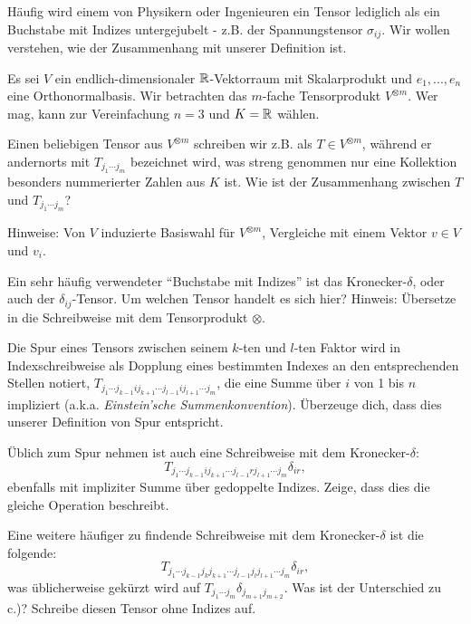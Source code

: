 \begin{sheet}
\begin{problem}[title={Aber Tensoren sind doch so Buchstaben mit Indizes}]
	\label{ex:TensorenMitIndizes}
	Häufig wird einem von Physikern oder Ingenieuren ein Tensor lediglich als ein Buchstabe mit Indizes untergejubelt - z.B. der Spannungstensor $\sigma_{ij}$. Wir wollen verstehen, wie der Zusammenhang mit unserer Definition ist.

	Es sei $V$ ein endlich-dimensionaler $\mathbb{R}$-Vektorraum mit Skalarprodukt und $e_1, ..., e_n$ eine Orthonormalbasis. Wir betrachten das $m$-fache Tensorprodukt $V^{\otimes m}$. Wer mag, kann zur Vereinfachung $n=3$ und $K=\mathbb{R}$ wählen.
	\begin{subproblem}
		Einen beliebigen Tensor aus $V^{\otimes m}$ schreiben wir z.B. als $T\in V^{\otimes m}$, während er andernorts mit $T_{j_1 \cdots j_m}$ bezeichnet wird, was streng genommen nur eine Kollektion besonders nummerierter Zahlen aus $K$ ist. Wie ist der Zusammenhang zwischen $T$ und $T_{j_1 \cdots j_m}$?

		Hinweise: Von $V$ induzierte Basiswahl für $V^{\otimes m}$, Vergleiche mit einem Vektor $v\in V$ und $v_i$.
	\end{subproblem}
	\begin{subproblem}
		Ein sehr häufig verwendeter \enquote{Buchstabe mit Indizes} ist das Kronecker-$\delta$, oder auch der $\delta_{ij}$-Tensor.
		Um welchen Tensor handelt es sich hier?
		Hinweis: Übersetze in die Schreibweise mit dem Tensorprodukt $\otimes$.
	\end{subproblem}
	\begin{subproblem}
		Die Spur eines Tensors zwischen seinem $k$-ten und $l$-ten Faktor wird in Indexschreibweise als Dopplung eines bestimmten Indexes an den entsprechenden Stellen notiert, $T_{j_1\cdots j_{k-1} i j_{k+1} \cdots j_{l-1} i j_{l+1}  \cdots j_m}$, die eine Summe über $i$ von 1 bis $n$ impliziert (a.k.a. \emph{Einstein'sche Summenkonvention}). Überzeuge dich, dass dies unserer Definition von Spur entspricht.

		Üblich zum Spur nehmen ist auch eine Schreibweise mit dem Kronecker-$\delta$: \[T_{j_1\cdots j_{k-1} i j_{k+1} \cdots j_{l-1} r j_{l+1}  \cdots j_m} \delta_{ir},\] ebenfalls mit impliziter Summe über gedoppelte Indizes. Zeige, dass dies die gleiche Operation beschreibt.
	\end{subproblem}
	\begin{subproblem}
		Eine weitere häufiger zu findende Schreibweise mit dem Kronecker-$\delta$ ist die folgende:
		\[T_{j_1\cdots j_{k-1} j_{k} j_{k+1} \cdots j_{l-1} j_l j_{l+1}  \cdots j_m} \delta_{ir},\]
		was üblicherweise gekürzt wird auf $T_{j_1\cdots j_m} \delta_{j_{m+1} j_{m+2}}$. Was ist der Unterschied zu c.)? Schreibe diesen Tensor ohne Indizes auf.
	\end{subproblem}
\end{problem}


\end{sheet}
